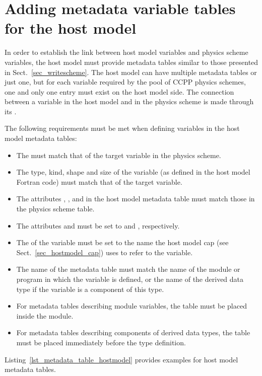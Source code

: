\section{Adding metadata variable tables for the host model}
In order to establish the link between host model variables and physics scheme variables, the host model must provide metadata tables similar to those presented in Sect.~\ref{sec_writescheme}. The host model can have multiple metadata tables or just one, but for each variable required by the pool of CCPP physics schemes, one and only one entry must exist on the host model side. The connection between a variable in the host model and in the physics scheme is made through its .

The following requirements must be met when defining variables in the host model metadata tables:
\begin{itemize}
\item The  must match that of the target variable in the physics scheme.
\item The type, kind, shape and size of the variable (as defined in the host model Fortran code) must match that of the target variable.
\item The attributes , ,  and  in the host model metadata table must match those in the physics scheme table.
\item The attributes  and  must be set to  and , respectively.
\item The  of the variable must be set to the name the host model cap (see Sect.~\ref{sec_hostmodel_cap}) uses to refer to the variable.
\item The name of the metadata table must match the name of the module or program in which the variable is defined, or the name of the derived data type if the variable is a component of this type.
\item For metadata tables describing module variables, the table must be placed inside the module.
\item For metadata tables describing components of derived data types, the table must be placed immediately before the type definition.
\end{itemize}
Listing~\ref{lst_metadata_table_hostmodel} provides examples for host model metadata tables.
